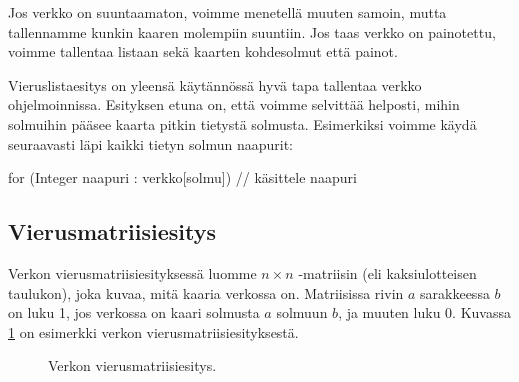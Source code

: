Jos verkko on suuntaamaton, voimme menetellä muuten samoin,
mutta tallennamme kunkin kaaren molempiin suuntiin.
Jos taas verkko on painotettu, voimme tallentaa listaan
sekä kaarten kohdesolmut että painot.

Vieruslistaesitys on yleensä käytännössä hyvä tapa
tallentaa verkko ohjelmoinnissa.
Esityksen etuna on, että voimme selvittää helposti,
mihin solmuihin pääsee kaarta pitkin tietystä solmusta.
Esimerkiksi voimme käydä seuraavasti läpi
kaikki tietyn solmun naapurit:

\begin{code}
for (Integer naapuri : verkko[solmu]) {
    // käsittele naapuri
}
\end{code}

\subsection{Vierusmatriisiesitys}

Verkon vierusmatriisiesityksessä luomme $n \times n$ -matriisin
(eli kaksiulotteisen taulukon), joka kuvaa, mitä kaaria verkossa on.
Matriisissa rivin $a$ sarakkeessa $b$ on luku 1,
jos verkossa on kaari solmusta $a$ solmuun $b$,
ja muuten luku 0.
Kuvassa \ref{fig:vervil} on esimerkki verkon
vierusmatriisiesityksestä.

\begin{figure}
\center
\begin{center}
\end{center}
\caption{Verkon vierusmatriisiesitys.}
\label{fig:vervil}
\end{figure}

